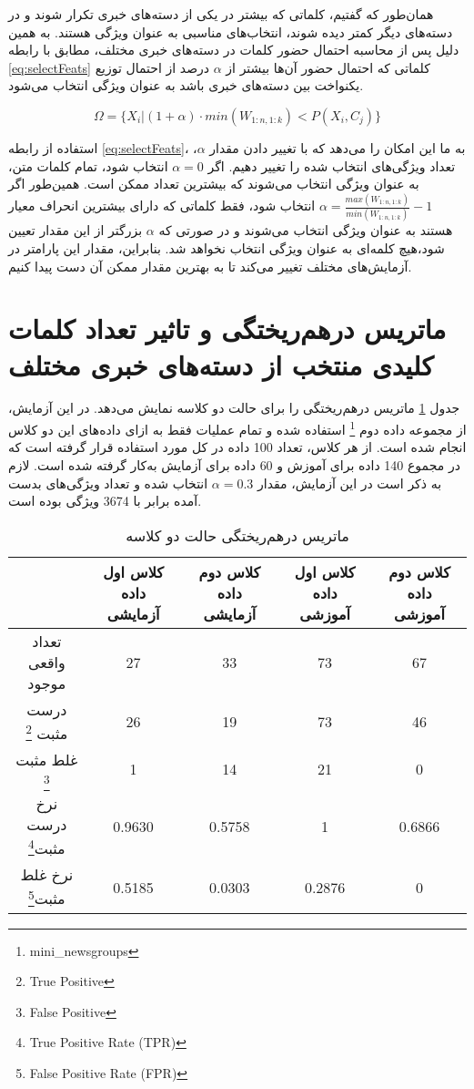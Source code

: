 \documentclass[11.5pt,a4paper]{article}
\begin{document}
همان‌طور که گفتیم، کلماتی که بیشتر در یکی از دسته‌های خبری تکرار شوند و در دسته‌های دیگر کمتر دیده شوند،‌ انتخاب‌های مناسبی به عنوان ویژگی هستند. به همین دلیل پس از محاسبه احتمال حضور کلمات در دسته‌های خبری مختلف، مطابق با رابطه \ref{eq:selectFeats} کلماتی که احتمال حضور آن‌ها بیشتر از $\alpha$ درصد از احتمال توزیع یکنواخت بین دسته‌های خبری باشد به عنوان ویژگی انتخاب می‌شود.

\begin{equation}
\label{eq:selectFeats}
\Omega = \{X_i | (1 + \alpha) \cdot min(W_{1:n,1:k}) < P(X_i , C_j)\}
\end{equation}

استفاده از رابطه \ref{eq:selectFeats}، به ما این امکان را می‌دهد که با تغییر دادن مقدار $\alpha$، تعداد ویژگی‌های انتخاب شده را تغییر دهیم. اگر $\alpha = 0 $ انتخاب شود، تمام کلمات متن، به عنوان ویژگی انتخاب می‌شوند که بیشترین تعداد ممکن است. همین‌طور اگر $\alpha = \frac{max(W_{1:n,1:k})}{min(W_{1:n,1:k})}-1$ انتخاب شود، فقط کلماتی که دارای بیشترین انحراف معیار هستند به عنوان ویژگی انتخاب می‌شوند و در صورتی‌ که $\alpha$ بزرگتر از این مقدار تعیین شود،‌هیچ کلمه‌ای به عنوان ویژگی انتخاب نخواهد شد. بنابراین، مقدار این پارامتر در آزمایش‌های مختلف تغییر می‌کند تا به بهترین مقدار ممکن آن دست پیدا کنیم.
\section{ماتریس درهم‌ریختگی و تاثیر تعداد کلمات کلیدی منتخب از دسته‌های خبری مختلف}

جدول
\ref{tbl:2ccm}
 ماتریس درهم‌ریختگی را برای حالت دو کلاسه نمایش می‌دهد. در این آزمایش،‌ از مجموعه داده دوم \footnote{mini\_newsgroups} استفاده شده و تمام عملیات فقط به ازای داده‌های این دو کلاس انجام شده است. از هر کلاس، تعداد 100 داده در کل مورد استفاده قرار گرفته است که در مجموع 140 داده برای آموزش و 60 داده برای آزمایش به‌کار گرفته شده است. لازم به ذکر است در این آزمایش، مقدار $\alpha = 0.3$ انتخاب شده و تعداد ویژگی‌های بدست آمده برابر با 3674 ویژگی بوده است.
\begin{table}[h]
\center
\caption{ماتریس درهم‌ریختگی حالت دو کلاسه}
\label{tbl:2ccm}
\begin{tabular}{c | c | c | c | c}
& کلاس اول داده آزمایشی & کلاس دوم داده آزمایشی & کلاس اول داده آموزشی& کلاس دوم داده آموزشی\\
\hline
\hline
تعداد واقعی موجود&  27 &  33 &73&67 \\
درست مثبت \footnote{True Positive}&   26  &   19 &73&46 \\
غلط مثبت \footnote{False Positive}&  1  &  14 &21&0 \\
نرخ درست مثبت\footnote{True Positive Rate (TPR)} &  0.9630   &   0.5758  &1&0.6866 \\
نرخ غلط مثبت\footnote{False Positive Rate (FPR)} &  0.5185   &   0.0303 &0.2876&0 \\

\end{tabular}
\end{table}
\end{document}
